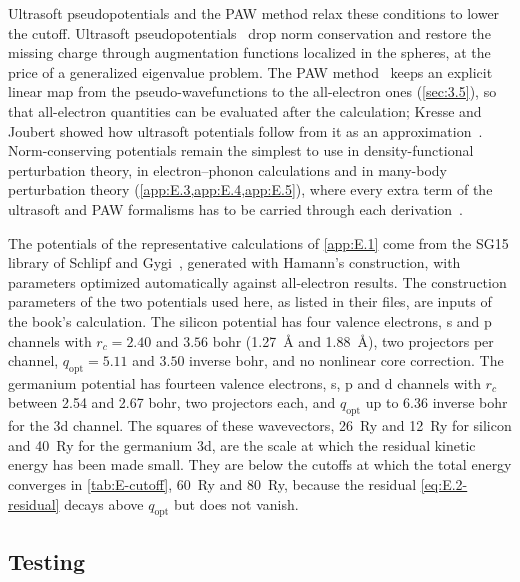 Ultrasoft pseudopotentials and the PAW method relax these conditions to lower the cutoff. Ultrasoft pseudopotentials~\cite{vanderbilt1990soft} drop norm conservation and restore the missing charge through augmentation functions localized in the spheres, at the price of a generalized eigenvalue problem. The PAW method~\cite{blochl1994projector} keeps an explicit linear map from the pseudo-wavefunctions to the all-electron ones (\cref{sec:3.5}), so that all-electron quantities can be evaluated after the calculation; Kresse and Joubert showed how ultrasoft potentials follow from it as an approximation~\cite{kresse1999ultrasoft}. Norm-conserving potentials remain the simplest to use in density-functional perturbation theory, in electron--phonon calculations and in many-body perturbation theory (\cref{app:E.3,app:E.4,app:E.5}), where every extra term of the ultrasoft and PAW formalisms has to be carried through each derivation~\cite{hamann2013optimized}.

The potentials of the representative calculations of \cref{app:E.1} come from the SG15 library of Schlipf and Gygi~\cite{schlipf2015optimization}, generated with Hamann's construction, with parameters optimized automatically against all-electron results. The construction parameters of the two potentials used here, as listed in their files, are inputs of the book's calculation. The silicon potential has four valence electrons, s and p channels with $r_c = 2.40$ and $3.56$ bohr (\SI{1.27}{\angstrom} and \SI{1.88}{\angstrom}), two projectors per channel, $q_{\mathrm{opt}} = 5.11$ and $3.50$ inverse bohr, and no nonlinear core correction. The germanium potential has fourteen valence electrons, s, p and d channels with $r_c$ between 2.54 and 2.67 bohr, two projectors each, and $q_{\mathrm{opt}}$ up to 6.36 inverse bohr for the 3d channel. The squares of these wavevectors, \SI{26}{Ry} and \SI{12}{Ry} for silicon and \SI{40}{Ry} for the germanium 3d, are the scale at which the residual kinetic energy has been made small. They are below the cutoffs at which the total energy converges in \cref{tab:E-cutoff}, \SI{60}{Ry} and \SI{80}{Ry}, because the residual \cref{eq:E.2-residual} decays above $q_{\mathrm{opt}}$ but does not vanish.

\subsection{Testing}

